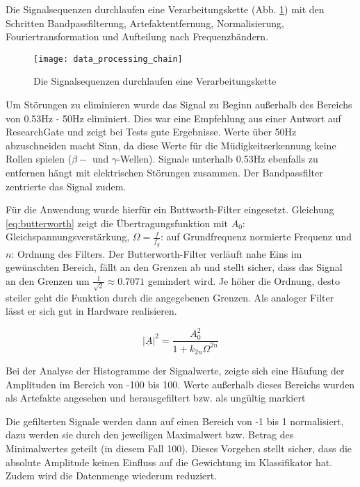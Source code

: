 \label{sec:processing}
Die Signalsequenzen durchlaufen eine Verarbeitungskette (Abb. \ref{fig:data_processing_chain}) mit den Schritten Bandpassfilterung, Artefaktentfernung, Normalisierung, Fouriertransformation und Aufteilung nach Frequenzbändern.

\begin{figure}[h] 
  \begin{center}
    \texttt{[image: data\_processing\_chain]}
    \caption[Verarbeitungskette]{Die Signalsequenzen durchlaufen eine Verarbeitungskette \label{fig:data_processing_chain}}
  \end{center}
\end{figure}

Um Störungen zu eliminieren wurde das Signal zu Beginn außerhalb des Bereichs von 0.53Hz - 50Hz eliminiert. Dies war eine Empfehlung aus einer Antwort auf ResearchGate \cite{resGate} und zeigt bei Tests gute Ergebnisse. Werte über 50Hz abzuschneiden macht Sinn, da diese Werte für die Müdigkeitserkennung keine Rollen spielen ($\beta-$ und $\gamma$-Wellen). Signale unterhalb 0.53Hz ebenfalls zu entfernen hängt mit elektrischen Störungen zusammen. Der Bandpassfilter zentrierte das Signal zudem. 

Für die Anwendung wurde hierfür ein Buttworth-Filter\cite{Butterworth30} eingesetzt. Gleichung \ref{eq:butterworth} zeigt die Übertragungsfunktion mit $A_0$: Gleichspannungsverstärkung, $\Omega = \frac{f}{f_g}$: auf Grundfrequenz normierte Frequenz und $n$: Ordnung des Filters.  Der Butterworth-Filter verläuft nahe Eins im gewünschten Bereich, fällt an den Grenzen ab und stellt sicher, dass das Signal an den Grenzen um $\frac{1}{\sqrt{2}} \approx 0.7071$ gemindert wird. Je höher die Ordnung, desto steiler geht die Funktion durch die angegebenen Grenzen. Als analoger Filter lässt er sich gut in Hardware realisieren.

\begin{equation} \label{eq:butterworth}
\left|\underline{A}\right|^2 = \frac{A_0^2}{1+ k_{2n} \Omega ^{2n}}
\end{equation}

Bei der Analyse der Histogramme der Signalwerte, zeigte sich eine Häufung der Amplituden im Bereich von -100 bis 100. Werte außerhalb dieses Bereichs wurden als Artefakte angesehen und herausgefiltert bzw. als ungültig markiert\rawHisto

Die gefilterten Signale werden dann auf einen Bereich von -1 bis 1 normalisiert, dazu werden sie durch den jeweiligen Maximalwert bzw. Betrag des Minimalwertes geteilt (in diesem Fall 100). Dieses Vorgehen stellt sicher, dass die absolute Amplitude keinen Einfluss auf die Gewichtung im Klassifikator hat. Zudem wird die Datenmenge wiederum reduziert. 

